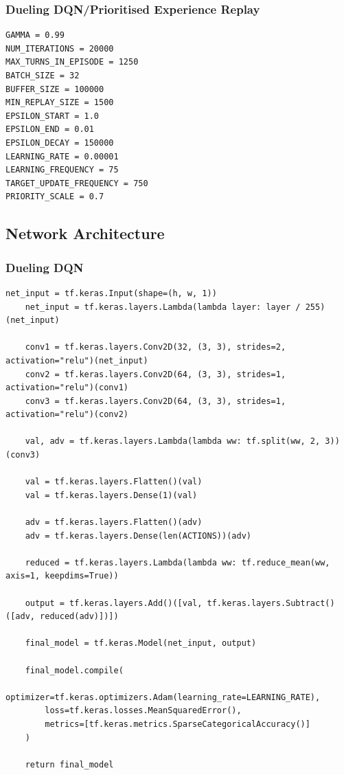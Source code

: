 \documentclass[12pt,a4paper]{article}
\begin{document}
    \subsubsection{Dueling DQN/Prioritised Experience Replay}
    \begin{lstlisting}[label={lst:ddqnperhyperparameters}]
GAMMA = 0.99
NUM_ITERATIONS = 20000
MAX_TURNS_IN_EPISODE = 1250
BATCH_SIZE = 32
BUFFER_SIZE = 100000
MIN_REPLAY_SIZE = 1500
EPSILON_START = 1.0
EPSILON_END = 0.01
EPSILON_DECAY = 150000
LEARNING_RATE = 0.00001
LEARNING_FREQUENCY = 75
TARGET_UPDATE_FREQUENCY = 750
PRIORITY_SCALE = 0.7
    \end{lstlisting}

    \subsection{Network Architecture}\label{subsec:network-architecture}
    \subsubsection{Dueling DQN}
    \begin{lstlisting}[label={lst:dueling}]
    net_input = tf.keras.Input(shape=(h, w, 1))
    net_input = tf.keras.layers.Lambda(lambda layer: layer / 255)(net_input)

    conv1 = tf.keras.layers.Conv2D(32, (3, 3), strides=2, activation="relu")(net_input)
    conv2 = tf.keras.layers.Conv2D(64, (3, 3), strides=1, activation="relu")(conv1)
    conv3 = tf.keras.layers.Conv2D(64, (3, 3), strides=1, activation="relu")(conv2)

    val, adv = tf.keras.layers.Lambda(lambda ww: tf.split(ww, 2, 3))(conv3)

    val = tf.keras.layers.Flatten()(val)
    val = tf.keras.layers.Dense(1)(val)

    adv = tf.keras.layers.Flatten()(adv)
    adv = tf.keras.layers.Dense(len(ACTIONS))(adv)

    reduced = tf.keras.layers.Lambda(lambda ww: tf.reduce_mean(ww, axis=1, keepdims=True))

    output = tf.keras.layers.Add()([val, tf.keras.layers.Subtract()([adv, reduced(adv)])])

    final_model = tf.keras.Model(net_input, output)

    final_model.compile(
        optimizer=tf.keras.optimizers.Adam(learning_rate=LEARNING_RATE),
        loss=tf.keras.losses.MeanSquaredError(),
        metrics=[tf.keras.metrics.SparseCategoricalAccuracy()]
    )

    return final_model
    \end{lstlisting} %
\end{document}
